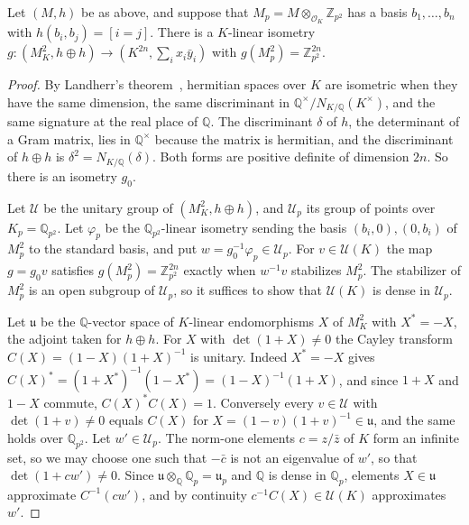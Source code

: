 \begin{lemma}\label{isometryp}
Let $(M,h)$ be as above, and suppose that $M_p=M\otimes_{\mathcal O_K}\mathbb Z_{p^2}$ has a basis $b_1,\dots,b_n$ with $h(b_i,b_j)=[i=j]$. There is a $K$-linear isometry $g\colon(M_K^2,h\oplus h)\to(K^{2n},\sum_ix_i\bar y_i)$ with $g(M_p^2)=\mathbb Z_{p^2}^{2n}$.
\end{lemma}

\begin{proof}
By Landherr's theorem~\cite[Chapter~10, Theorem~6.9]{scharlau}, hermitian spaces over $K$ are isometric when they have the same dimension, the same discriminant in $\mathbb Q^\times/N_{K/\mathbb Q}(K^\times)$, and the same signature at the real place of $\mathbb Q$. The discriminant $\delta$ of $h$, the determinant of a Gram matrix, lies in $\mathbb Q^\times$ because the matrix is hermitian, and the discriminant of $h\oplus h$ is $\delta^2=N_{K/\mathbb Q}(\delta)$. Both forms are positive definite of dimension $2n$. So there is an isometry $g_0$.

Let $\mathcal U$ be the unitary group of $(M_K^2,h\oplus h)$, and $\mathcal U_p$ its group of points over $K_p=\mathbb Q_{p^2}$. Let $\varphi_p$ be the $\mathbb Q_{p^2}$-linear isometry sending the basis $(b_i,0),(0,b_i)$ of $M_p^2$ to the standard basis, and put $w=g_0^{-1}\varphi_p\in\mathcal U_p$. For $v\in\mathcal U(K)$ the map $g=g_0v$ satisfies $g(M_p^2)=\mathbb Z_{p^2}^{2n}$ exactly when $w^{-1}v$ stabilizes $M_p^2$. The stabilizer of $M_p^2$ is an open subgroup of $\mathcal U_p$, so it suffices to show that $\mathcal U(K)$ is dense in $\mathcal U_p$.

Let $\mathfrak u$ be the $\mathbb Q$-vector space of $K$-linear endomorphisms $X$ of $M_K^2$ with $X^\ast=-X$, the adjoint taken for $h\oplus h$. For $X$ with $\det(1+X)\ne0$ the Cayley transform $C(X)=(1-X)(1+X)^{-1}$ is unitary. Indeed $X^\ast=-X$ gives $C(X)^\ast=(1+X^\ast)^{-1}(1-X^\ast)=(1-X)^{-1}(1+X)$, and since $1+X$ and $1-X$ commute, $C(X)^\ast C(X)=1$. Conversely every $v\in\mathcal U$ with $\det(1+v)\ne0$ equals $C(X)$ for $X=(1-v)(1+v)^{-1}\in\mathfrak u$, and the same holds over $\mathbb Q_{p^2}$. Let $w'\in\mathcal U_p$. The norm-one elements $c=z/\bar z$ of $K$ form an infinite set, so we may choose one such that $-\bar c$ is not an eigenvalue of $w'$, so that $\det(1+cw')\ne0$. Since $\mathfrak u\otimes_{\mathbb Q}\mathbb Q_p=\mathfrak u_p$ and $\mathbb Q$ is dense in $\mathbb Q_p$, elements $X\in\mathfrak u$ approximate $C^{-1}(cw')$, and by continuity $c^{-1}C(X)\in\mathcal U(K)$ approximates $w'$.
\end{proof}

